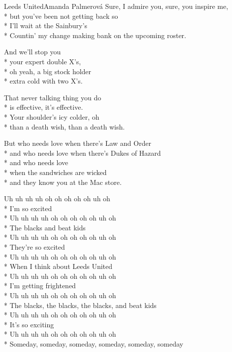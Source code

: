 \documentclass[10.5pt]{book}
\begin{document}
\begin{poem}{Leeds United}{Amanda Palmerová}
Sure, I admire you, sure, you inspire me,\\*
but you've been not getting back so\\*
I'll wait at the Sainbury's\\*
Countin' my change making bank on the upcoming roster.

And we'll stop you\\*
your expert double X's,\\*
oh yeah, a big stock holder\\*
extra cold with two X's.

That never talking thing you do\\*
is effective, it's effective.\\*
Your shoulder's icy colder, oh\\*
than a death wish, than a death wish.

But who needs love when there's Law and Order\\*
and who needs love when there's Dukes of Hazard\\*
and who needs love\\*
when the sandwiches are wicked\\*
and they know you at the Mac store.

Uh uh uh uh oh oh oh oh oh uh oh\\*
I'm so excited\\*
Uh uh uh uh oh oh oh oh oh uh oh\\*
The blacks and beat kids\\*
Uh uh uh uh oh oh oh oh oh uh oh\\*
They're so excited\\*
Uh uh uh uh oh oh oh oh oh uh oh\\*
When I think about Leeds United\\*
Uh uh uh uh oh oh oh oh oh uh oh\\*
I'm getting frightened\\*
Uh uh uh uh oh oh oh oh oh uh oh\\*
The blacks, the blacks, the blacks, and beat kids\\*
Uh uh uh uh oh oh oh oh oh uh oh\\*
It's so exciting\\*
Uh uh uh uh oh oh oh oh oh uh oh\\*
Someday, someday, someday, someday, someday, \mbox{someday}

\end{poem}
\end{document}
